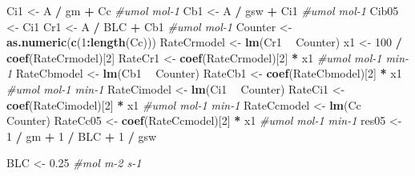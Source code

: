 \documentclass[
]{krantz}
\makeatletter
\newenvironment{Shaded}{\begin{snugshade}}{\end{snugshade}}
\newcommand{\CommentTok}[1]{\textcolor[rgb]{0.56,0.35,0.01}{\textit{#1}}}
\newcommand{\DecValTok}[1]{\textcolor[rgb]{0.00,0.00,0.81}{#1}}
\newcommand{\FloatTok}[1]{\textcolor[rgb]{0.00,0.00,0.81}{#1}}
\newcommand{\KeywordTok}[1]{\textcolor[rgb]{0.13,0.29,0.53}{\textbf{#1}}}
\newcommand{\NormalTok}[1]{#1}
\newcommand{\OperatorTok}[1]{\textcolor[rgb]{0.81,0.36,0.00}{\textbf{#1}}}
\newcommand{\StringTok}[1]{\textcolor[rgb]{0.31,0.60,0.02}{#1}}
\newenvironment{kframe}{%
\medskip{}
\setlength{\fboxsep}{.8em}
 \def\at@end@of@kframe{}%
 \ifinner\ifhmode%
  \def\at@end@of@kframe{\end{minipage}}%
  \begin{minipage}{\columnwidth}%
 \fi\fi%
 \def\FrameCommand##1{\hskip\@totalleftmargin \hskip-\fboxsep
 \colorbox{shadecolor}{##1}\hskip-\fboxsep
     \hskip-\linewidth \hskip-\@totalleftmargin \hskip\columnwidth}%
 \MakeFramed {\advance\hsize-\width
   \@totalleftmargin\z@ \linewidth\hsize
   \@setminipage}}%
 {\par\unskip\endMakeFramed%
 \at@end@of@kframe}
\renewenvironment{Shaded}{\begin{kframe}}{\end{kframe}}
\makeatother
\begin{document}
\begin{Shaded}
\begin{Highlighting}[]
\NormalTok{Ci1 <-}\StringTok{ }\NormalTok{A }\OperatorTok{/}\StringTok{ }\NormalTok{gm }\OperatorTok{+}\StringTok{ }\NormalTok{Cc }\CommentTok{#umol mol-1}
\NormalTok{Cb1 <-}\StringTok{ }\NormalTok{A }\OperatorTok{/}\StringTok{ }\NormalTok{gsw }\OperatorTok{+}\StringTok{ }\NormalTok{Ci1 }\CommentTok{#umol mol-1}
\NormalTok{Cib05 <-}\StringTok{ }\NormalTok{Ci1}
\NormalTok{Cr1 <-}\StringTok{ }\NormalTok{A }\OperatorTok{/}\StringTok{ }\NormalTok{BLC }\OperatorTok{+}\StringTok{ }\NormalTok{Cb1 }\CommentTok{#umol mol-1}
\NormalTok{Counter <-}\StringTok{ }\KeywordTok{as.numeric}\NormalTok{(}\KeywordTok{c}\NormalTok{(}\DecValTok{1}\OperatorTok{:}\KeywordTok{length}\NormalTok{(Cc)))}
\NormalTok{RateCrmodel <-}\StringTok{ }\KeywordTok{lm}\NormalTok{(Cr1 }\OperatorTok{~}\StringTok{ }\NormalTok{Counter)}
\NormalTok{x1 <-}\StringTok{ }\DecValTok{100} \OperatorTok{/}\StringTok{ }\KeywordTok{coef}\NormalTok{(RateCrmodel)[}\DecValTok{2}\NormalTok{]}
\NormalTok{RateCr1 <-}\StringTok{ }\KeywordTok{coef}\NormalTok{(RateCrmodel)[}\DecValTok{2}\NormalTok{] }\OperatorTok{*}\StringTok{ }\NormalTok{x1 }\CommentTok{#umol mol-1 min-1}
\NormalTok{RateCbmodel <-}\StringTok{ }\KeywordTok{lm}\NormalTok{(Cb1 }\OperatorTok{~}\StringTok{ }\NormalTok{Counter)}
\NormalTok{RateCb1 <-}\StringTok{ }\KeywordTok{coef}\NormalTok{(RateCbmodel)[}\DecValTok{2}\NormalTok{] }\OperatorTok{*}\StringTok{ }\NormalTok{x1 }\CommentTok{#umol mol-1 min-1}
\NormalTok{RateCimodel <-}\StringTok{ }\KeywordTok{lm}\NormalTok{(Ci1 }\OperatorTok{~}\StringTok{ }\NormalTok{Counter)}
\NormalTok{RateCi1 <-}\StringTok{ }\KeywordTok{coef}\NormalTok{(RateCimodel)[}\DecValTok{2}\NormalTok{] }\OperatorTok{*}\StringTok{ }\NormalTok{x1 }\CommentTok{#umol mol-1 min-1}
\NormalTok{RateCcmodel <-}\StringTok{ }\KeywordTok{lm}\NormalTok{(Cc }\OperatorTok{~}\StringTok{ }\NormalTok{Counter)}
\NormalTok{RateCc05 <-}\StringTok{ }\KeywordTok{coef}\NormalTok{(RateCcmodel)[}\DecValTok{2}\NormalTok{] }\OperatorTok{*}\StringTok{ }\NormalTok{x1 }\CommentTok{#umol mol-1 min-1}
\NormalTok{res05 <-}\StringTok{ }\DecValTok{1} \OperatorTok{/}\StringTok{ }\NormalTok{gm }\OperatorTok{+}\StringTok{ }\DecValTok{1} \OperatorTok{/}\StringTok{ }\NormalTok{BLC }\OperatorTok{+}\StringTok{ }\DecValTok{1} \OperatorTok{/}\StringTok{ }\NormalTok{gsw}

\NormalTok{BLC <-}\StringTok{ }\FloatTok{0.25} \CommentTok{#mol m-2 s-1}


\end{Highlighting}
\end{Shaded}
\end{document}
